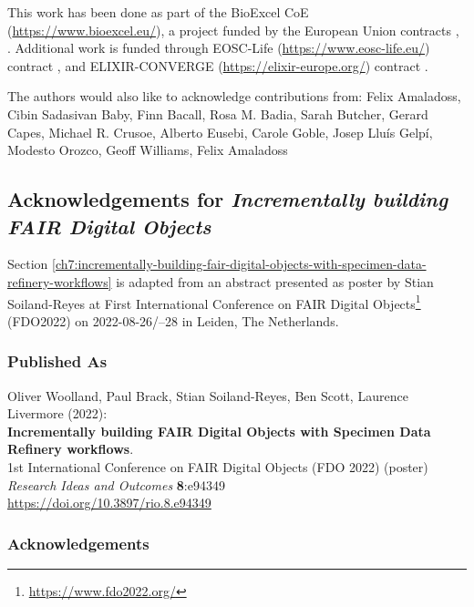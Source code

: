 This work has been done as part of the BioExcel CoE
(\url{https://www.bioexcel.eu/}), a project funded by the European Union
contracts
,
. Additional work is funded through EOSC-Life
(\url{https://www.eosc-life.eu/}) contract
, and ELIXIR-CONVERGE (\url{https://elixir-europe.org/}) contract
.

The authors would also like to acknowledge contributions from: Felix
Amaladoss, Cibin Sadasivan Baby, Finn Bacall, Rosa M. Badia, Sarah
Butcher, Gerard Capes, Michael R. Crusoe, Alberto Eusebi, Carole Goble,
Josep Lluís Gelpí, Modesto Orozco, Geoff Williams, Felix Amaladoss



\subsection{Acknowledgements for \emph{Incrementally building FAIR Digital Objects}}

Section \vref{ch7:incrementally-building-fair-digital-objects-with-specimen-data-refinery-workflows}  is adapted from an abstract
presented as poster by Stian Soiland-Reyes at 
First International Conference on FAIR Digital Objects\footnote{\url{https://www.fdo2022.org/}}
(FDO2022) on
2022-08-26/--28 in Leiden, The Netherlands. 

\subsubsection*{Published As}

Oliver Woolland, Paul Brack, Stian Soiland-Reyes, Ben Scott, Laurence
Livermore (2022):\\
\textbf{Incrementally building FAIR Digital Objects with Specimen Data
Refinery workflows}.\\
1st International Conference on FAIR Digital Objects
(FDO 2022) (poster)\\
\emph{Research Ideas and Outcomes} \textbf{8}:e94349\\
\url{https://doi.org/10.3897/rio.8.e94349}


\subsubsection*{Acknowledgements}

